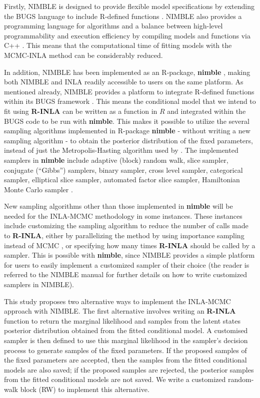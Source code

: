 \documentclass[
]{article}
\begin{document}
Firstly, NIMBLE is designed to provide flexible model specifications by
extending the BUGS language to include R-defined functions
\citep{nimblemanual}. NIMBLE also provides a programming language for
algorithms and a balance between high-level programmability and
execution efficiency by compiling models and functions via C++
\citep{nimblearticle, nimblemanual}. This means that the computational
time of fitting models with the MCMC-INLA method can be considerably
reduced.

In addition, NIMBLE has been implemented as an R-package,
\textbf{nimble} \citep{nimblePackage}, making both NIMBLE and INLA
readily accessible to users on the same platform. As mentioned already,
NIMBLE provides a platform to integrate R-defined functions within its
BUGS framework \citep{nimblemanual}. This means the conditional model
that we intend to fit using \textbf{R-INLA} can be written as a function
in \(R\) \citep{Rsoftware} and integrated within the BUGS code to be run
with \textbf{nimble}. This makes it possible to utilize the several
sampling algorithms implemented in R-package \textbf{nimble} - without
writing a new sampling algorithm - to obtain the posterior distribution
of the fixed parameters, instead of just the Metropolis-Hasting
algorithm used by \cite{gomez2018markov}. The implemented samplers in
\textbf{nimble} include adaptive (block) random walk, slice sampler,
conjugate (``Gibbs'') samplers, binary sampler, cross level sampler,
categorical sampler, elliptical slice sampler, automated factor slice
sampler, Hamiltonian Monte Carlo sampler \citep{nimblemanual}.

New sampling algorithms other than those implemented in \textbf{nimble}
will be needed for the INLA-MCMC methodology in some instances. These
instances include customizing the sampling algorithm to reduce the
number of calls made to \textbf{R-INLA}, either by parallelizing the
method by using importance sampling instead of MCMC
\citep{berild2022importance}, or specifying how many times
\textbf{R-INLA} should be called by a sampler. This is possible with
\textbf{nimble}, since NIMBLE provides a simple platform for users to
easily implement a customized sampler of their choice (the reader is
referred to the NIMBLE manual \citet{nimblemanual} for further details
on how to write customized samplers in NIMBLE).

This study proposes two alternative ways to implement the INLA-MCMC
approach with NIMBLE. The first alternative involves writing an
\textbf{R-INLA} function to return the marginal likelihood and samples
from the latent states posterior distribution obtained from the fitted
conditional model. A customised sampler is then defined to use this
marginal likelihood in the sampler's decision process to generate
samples of the fixed parameters. If the proposed samples of the fixed
parameters are accepted, then the samples from the fitted conditional
models are also saved; if the proposed samples are rejected, the
posterior samples from the fitted conditional models are not saved. We
write a customized random-walk block (RW) to implement this alternative.
\end{document}
